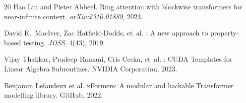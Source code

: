 \documentclass[10pt,twocolumn]{article}
\begin{document}
\begin{thebibliography}{20}
Hao Liu and Pieter Abbeel.
\newblock Ring attention with blockwise transformers for near-infinite context.
\newblock \emph{arXiv:2310.01889}, 2023.

David R.~MacIver, Zac Hatfield-Dodds, et~al.
: A new approach to property-based testing.
\newblock \emph{JOSS}, 4(43), 2019.

Vijay Thakkar, Pradeep Ramani, Cris Cecka, et~al.
: CUDA Templates for Linear Algebra Subroutines.
\newblock NVIDIA Corporation, 2023.

Benjamin Lefaudeux et al.
\newblock xFormers: A modular and hackable Transformer modelling library.
\newblock GitHub, 2022.

\end{thebibliography}
\end{document}
